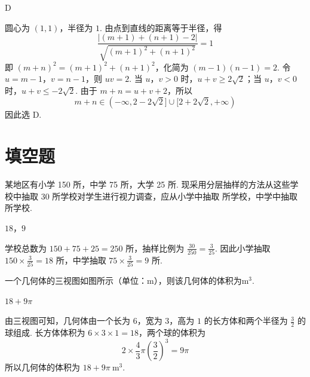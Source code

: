 \begin{answer}
D
\end{answer}

\begin{solution}
圆心为 \((1,1)\)，半径为 \(1\). 由点到直线的距离等于半径，得
\[
\frac{|(m+1)+(n+1)-2|}{\sqrt{(m+1)^2+(n+1)^2}}=1
\]
即 \((m+n)^2=(m+1)^2+(n+1)^2\)，化简为 \((m-1)(n-1)=2\). 令 \(u=m-1\)，\(v=n-1\)，则 \(uv=2\). 当 \(u\)，\(v>0\) 时，\(u+v\geqslant2\sqrt2\)；当 \(u\)，\(v<0\) 时，\(u+v\leqslant-2\sqrt2\). 由于 \(m+n=u+v+2\)，所以
\[
m+n\in(-\infty,2-2\sqrt2]\cup[2+2\sqrt2,+\infty)
\]
因此选 D.
\end{solution}

\section{填空题}

\begin{problem}
某地区有小学 150 所，中学 75 所，大学 25 所. 现采用分层抽样的方法从这些学校中抽取 30 所学校对学生进行视力调查，应从小学中抽取\fillinblank{} 所学校，中学中抽取\fillinblank{} 所学校.
\end{problem}

\begin{answer}
\(18\)，\(9\)
\end{answer}

\begin{solution}
学校总数为 \(150+75+25=250\) 所，抽样比例为 \(\frac{30}{250}=\frac3{25}\). 因此小学抽取 \(150\times\frac3{25}=18\) 所，中学抽取 \(75\times\frac3{25}=9\) 所.
\end{solution}

\begin{problem}
一个几何体的三视图如图所示（单位：\(\mathrm{m}\)），则该几何体的体积为\fillinblank{}\(\mathrm{m}^3\).

\end{problem}

\begin{answer}
\(18 + 9\pi\)
\end{answer}

\begin{solution}
由三视图可知，几何体由一个长为 \(6\)，宽为 \(3\)，高为 \(1\) 的长方体和两个半径为 \(\frac32\) 的球组成. 长方体体积为 \(6\times3\times1=18\)，两个球的体积为
\[
2\times\frac43\pi\left(\frac32\right)^3=9\pi
\]
所以几何体的体积为 \(18+9\pi\mathrm{~m}^3\).
\end{solution}


